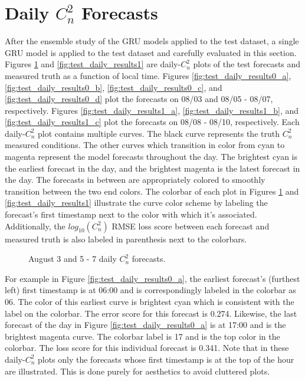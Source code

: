 \section{Daily $C_{n}^{2}$ Forecasts}
After the ensemble study of the GRU models applied to the test dataset, a single GRU model is applied to the test dataset and carefully evaluated in this section. Figures \ref{fig:test_daily_results0} and \ref{fig:test_daily_results1} are daily-$C_{n}^{2}$ plots of the test forecasts and measured truth as a function of local time. Figures \ref{fig:test_daily_results0_a}, \ref{fig:test_daily_results0_b}, \ref{fig:test_daily_results0_c}, and \ref{fig:test_daily_results0_d} plot the forecasts on 08/03 and 08/05 - 08/07, respectively.  Figures \ref{fig:test_daily_results1_a}, \ref{fig:test_daily_results1_b}, and \ref{fig:test_daily_results1_c} plot the forecasts on 08/08 - 08/10, respectively. Each daily-$C_{n}^{2}$ plot contains multiple curves. The black curve represents the truth $C_{n}^{2}$ measured conditions. The other curves which transition in color from cyan to magenta represent the model forecasts throughout the day. The brightest cyan is the earliest forecast in the day, and the brightest magenta is the latest forecast in the day. The forecasts in between are appropriately colored to smoothly transition between the two end colors. The colorbar of each plot in Figures \ref{fig:test_daily_results0} and \ref{fig:test_daily_results1} illustrate the curve color scheme by labeling the forecast's first timestamp next to the color with which it's associated. Additionally, the $log_{10}(C_{n}^{2})$ RMSE loss score between each forecast and measured truth is also labeled in parenthesis next to the colorbars.
\begin{figure}[h!]
	\centering
	\hfill
	\hfill
	\caption{August 3 and 5 - 7 daily $C_{n}^{2}$ forecasts.}
	\label{fig:test_daily_results0}
\end{figure}
For example in Figure \ref{fig:test_daily_results0_a}, the earliest forecast's (furthest left) first timestamp is at 06:00 and is correspondingly labeled in the colorbar as 06. The color of this earliest curve is brightest cyan which is consistent with the label on the colorbar. The error score for this forecast is 0.274. Likewise, the last forecast of the day in Figure \ref{fig:test_daily_results0_a} is at 17:00 and is the brightest magenta curve. The colorbar label is 17 and is the top color in the colorbar. The loss score for this individual forecast is 0.341. Note that in these daily-$C_{n}^{2}$ plots only the forecasts whose first timestamp is at the top of the hour are illustrated. This is done purely for aesthetics to avoid cluttered plots.

